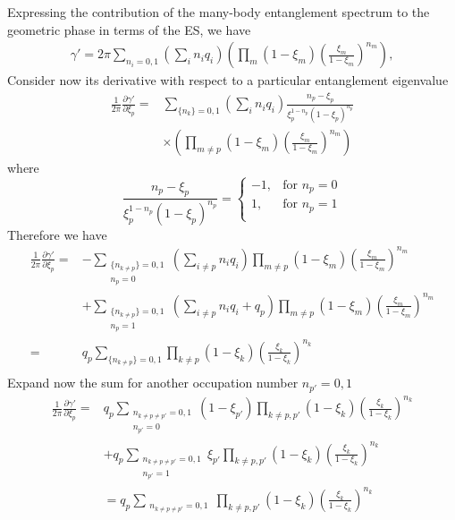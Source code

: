 \documentclass[prb,twocolumn,amsmath,amssymb,superscriptaddress]{revtex4-1}
\begin{document}
Expressing the contribution of the many-body entanglement spectrum to the geometric phase in terms of the ES, we have
\begin{align*}
\gamma' = 2\pi \sum_{n_i = 0,1} \left(\sum_{i } n_i q_i\right) \left(\prod_m (1- \xi_m)\left(\frac{\xi_m}{1-\xi_m} \right)^{n_m} \right) ,
\end{align*} 
Consider now its derivative with respect to a particular entanglement eigenvalue
\begin{align}
\frac{1}{2\pi}\frac{\partial \gamma'}{\partial \xi_p} =& \sum_{\{n_k\}=0,1}\left(\sum_{i } n_i q_i\right)\frac{n_p - \xi_p}{\xi_p^{1-n_p}(1-\xi_p)^{n_p}}\\
&\times \left(\prod_{m\neq p} (1- \xi_m)\left(\frac{\xi_m}{1-\xi_m} \right)^{n_m} \right)
\end{align}
where
\begin{equation}
 \frac{n_p - \xi_p}{\xi_p^{1-n_p}(1-\xi_p)^{n_p}} = 
  \begin{cases}
    -1, & \text{for } n_p=0 \\
    1, & \text{for } n_p = 1 \\
  \end{cases}	
\end{equation}
Therefore we have
\begin{align*}
\frac{1}{2\pi}\frac{\partial \gamma'}{\partial \xi_p} =& -\sum_{\substack{\{n_{k\neq p}\}=0,1 \\ n_p = 0}}\left(\sum_{i \neq p} n_i q_i\right)\prod_{m\neq p} (1-\xi_m)\left( \frac{\xi_m}{1-\xi_m} \right)^{n_m} \\
&+ \sum_{\substack{\{n_{k\neq p}\}=0,1 \\ n_p = 1}}\left(\sum_{i \neq p} n_i q_i +q_p\right) \prod_{m\neq p} (1-\xi_m)\left( \frac{\xi_m}{1-\xi_m} \right)^{n_m} \\
=&q_p\sum_{\{n_{k\neq p}\}=0,1} \prod_{k\neq p} (1-\xi_k)\left( \frac{\xi_k}{1-\xi_k} \right)^{n_k} \\
\end{align*}
Expand now the sum  for another occupation number $n_{p'} = 0,1$ 
\begin{align*}
\frac{1}{2\pi}\frac{\partial \gamma'}{\partial \xi_p} =& q_p\sum_{\substack{n_{k \neq p \neq p'}=0,1\\ n_{p'}= 0}} (1-\xi_{p'})\prod_{k\neq p,p'} (1-\xi_k)\left( \frac{\xi_k}{1-\xi_k} \right)^{n_k} \\
&+ q_p\sum_{\substack{n_{k \neq p \neq p'}=0,1\\ n_{p'}= 1}} \xi_{p'}\prod_{k\neq p,p'} (1-\xi_k)\left( \frac{\xi_k}{1-\xi_k} \right)^{n_k} \\
 &=q_p\sum_{\substack{n_{k \neq p \neq p'}=0,1}} \prod_{k\neq p,p'} (1-\xi_k)\left( \frac{\xi_k}{1-\xi_k} \right)^{n_k} 
\end{align*}
\end{document}
